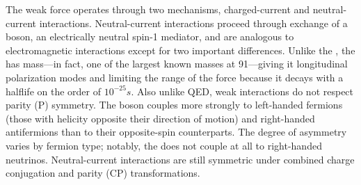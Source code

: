 The weak force operates through two mechanisms, charged-current and neutral-current interactions.
Neutral-current interactions proceed through exchange of a {\PZ} boson, an electrically neutral spin-1 mediator, and are analogous to electromagnetic interactions except for two important differences.
Unlike the {\Pa}, the {\PZ} has mass---in fact, one of the largest known masses at 91\GeV---giving it longitudinal polarization modes and limiting the range of the force because it decays with a halflife on the order of $10^{-25}\unit{s}$.
Also unlike QED, weak interactions do not respect parity (P) symmetry.
The {\PZ} boson couples more strongly to left-handed fermions (those with helicity opposite their direction of motion) and right-handed antifermions than to their opposite-spin counterparts.
The degree of asymmetry varies by fermion type; notably, the {\PZ} does not couple at all to right-handed neutrinos.
Neutral-current interactions are still symmetric under combined charge conjugation and parity (CP) transformations.

